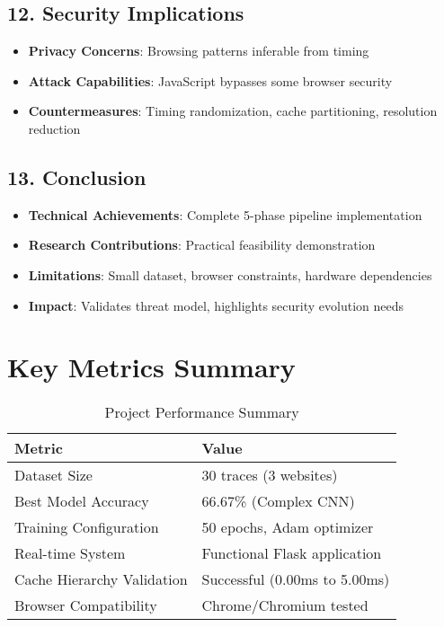 \documentclass[11pt,a4paper]{article}
\begin{document}
\subsection{12. Security Implications}
\begin{itemize}[leftmargin=*]
    \item \textbf{Privacy Concerns}: Browsing patterns inferable from timing
    \item \textbf{Attack Capabilities}: JavaScript bypasses some browser security
    \item \textbf{Countermeasures}: Timing randomization, cache partitioning, resolution reduction
\end{itemize}

\subsection{13. Conclusion}
\begin{itemize}[leftmargin=*]
    \item \textbf{Technical Achievements}: Complete 5-phase pipeline implementation
    \item \textbf{Research Contributions}: Practical feasibility demonstration
    \item \textbf{Limitations}: Small dataset, browser constraints, hardware dependencies
    \item \textbf{Impact}: Validates threat model, highlights security evolution needs
\end{itemize}

\section{Key Metrics Summary}

\begin{table}[H]
\centering
\caption{Project Performance Summary}
\begin{tabular}{@{}ll@{}}
\toprule
\textbf{Metric} & \textbf{Value} \\
\midrule
Dataset Size & 30 traces (3 websites) \\
Best Model Accuracy & 66.67\% (Complex CNN) \\
Training Configuration & 50 epochs, Adam optimizer \\
Real-time System & Functional Flask application \\
Cache Hierarchy Validation & Successful (0.00ms to 5.00ms) \\
Browser Compatibility & Chrome/Chromium tested \\
\bottomrule
\end{tabular}
\end{table}
\end{document}
